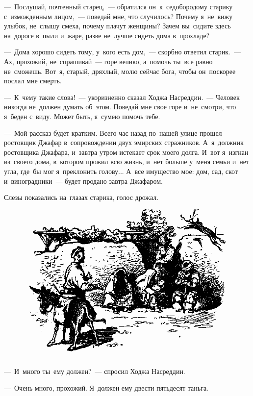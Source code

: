 \documentclass[12pt,a4paper]{book}
\begin{document}
—~Послушай, почтенный старец,~— обратился он~к~седобородому старику с~изможденным лицом,~— поведай мне, что случилось? Почему я~не~вижу улыбок, не~слышу смеха, почему плачут женщины? Зачем вы~сидите здесь на~дороге в~пыли и~жаре, разве не~лучше сидеть дома в~прохладе?

—~Дома хорошо сидеть тому, у~кого есть дом,~— скорбно ответил старик.~— Ах, прохожий, не~спрашивай~— горе велико, а~помочь ты~все равно не~сможешь. Вот~я, старый, дряхлый, молю сейчас бога, чтобы он~поскорее послал мне смерть.

—~К~чему такие слова!~— укоризненно сказал Ходжа Насреддин.~— Человек никогда не~должен думать об~этом. Поведай мне свое горе и~не~смотри, что я~беден с~виду. Может быть, я~сумею помочь тебе.

—~Мой рассказ будет кратким. Всего час назад по~нашей улице прошел ростовщик Джафар в~сопровождении двух эмирских стражников. А~я~должник ростовщика Джафара, и~завтра утром истекает срок моего долга. И~вот я~изгнан из~своего дома, в~котором прожил всю жизнь, и~нет больше у~меня семьи и~нет угла, где~бы мог я~преклонить голову... А~все имущество мое: дом, сад, скот и~виноградники~— будет продано завтра Джафаром.

Слезы показались на~глазах старика, голос дрожал.

\begin{figure}[h]
\centering
\includegraphics[width=\textwidth]{4.png}
\end{figure}

—~И~много ты~ему должен?~— спросил Ходжа Насреддин.

—~Очень много, прохожий. Я~должен ему двести пятьдесят таньга.
\end{document}
